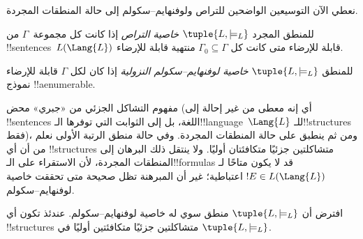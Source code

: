 \documentclass[../../../include/open-logic-section]{subfiles}
\begin{document}


نعطي الآن التوسيعين الواضحين للتراص ولوفنهايم--سكولم إلى حالة المنطقات
المجردة.

\begin{defn}
للمنطق المجرد $\tuple{L,\models_L}$ \emph{خاصية التراص} إذا كانت كل
مجموعة~$\Gamma$ من !!{sentence}s~$L(\Lang{L})$ قابلة للإرضاء متى كانت
كل $\Gamma_0 \subseteq \Gamma$ منتهية قابلة للإرضاء.
\end{defn}

\begin{defn}
للمنطق $\tuple{L,\models_L}$ \emph{خاصية لوفنهايم--سكولم النزولية} إذا
كان لكل $\Gamma$ قابلة للإرضاء نموذج !!a{enumerable}.
\end{defn}


مفهوم التشاكل الجزئي من  «جبري» محض
(أي إنه معطى من غير إحالة إلى !!{sentence}s اللغة، بل إلى الثوابت التي
توفرها الـ!!{language}~$\Lang{L}$ للـ!!{structure}s فقط)، ومن ثم ينطبق
على حالة المنطقات المجردة. وفي حالة منطق الرتبة الأولى نعلم من
 أن أي !!{structure}s متشاكلتين جزئيًا
متكافئتان أوليًا. ولا ينتقل ذلك البرهان إلى المنطقات المجردة، لأن
الاستقراء على الـ!!{formula}s قد لا يكون متاحًا لـ$!E \in L(\Lang{L})$
اعتباطية؛ غير أن المبرهنة تظل صحيحة متى تحققت خاصية لوفنهايم--سكولم.

\begin{thm}
افترض أن $\tuple{L,\models_L}$ منطق سوي له خاصية لوفنهايم--سكولم.
عندئذ تكون أي !!{structure}s متشاكلتين جزئيًا متكافئتين أوليًا في
$\tuple{L,\models_L}$.
\end{thm}
\end{document}
